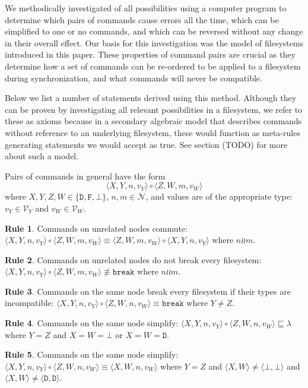 \documentclass[12pt]{article}
\newcommand{\setvx}[1]{\mathcal{V}_{#1}} %
\newcommand{\setn}{\mathcal{N}} %
\newcommand{\empt}{\bot}
\newcommand{\cbrk}{\mathtt{break}} %
\newcommand{\ccharb}{\empt}
\newcommand{\ccharf}{\mathtt{F}}
\newcommand{\cchard}{\mathtt{D}}
\newcommand{\valvy}{v_Y} %
\newcommand{\valvw}{v_W}
\newcommand{\typeset}{\{\cchard,\ccharf,\ccharb\}} %
\newcommand{\caa}[2]{\langle{#1,#2}\rangle}
\newcommand{\caaaa}[4]{\langle{#1,#2,#3,#4}\rangle}
\newcommand{\cbb}{\caa{\ccharb}{\ccharb}}
\newcommand{\cdd}{\caa{\cchard}{\cchard}}
\newcommand{\cxynv}{\caaaa{X}{Y}{n}{\valvy}}
\newcommand{\cxw}{\caa{X}{W}}
\newcommand{\cxwnv}{\caaaa{X}{W}{n}{\valvw}}
\newcommand{\czwnv}{\caaaa{Z}{W}{n}{\valvw}}
\newcommand{\czwmv}{\caaaa{Z}{W}{m}{\valvw}}
\newcommand{\cc}{\circ} %
\newcommand{\eqext}{\sqsubseteq} %
\newcommand{\nequiv}{\not\equiv}
\newcommand{\indep}{\mathrel{\wr\wr}} %
\newcommand{\unrel}{\indep} %
\newcommand{\emptyseq}{\lambda} %
\theoremstyle{definition}
\newtheorem{myax}{Rule}
\begin{document}
We methodically investigated of all possibilities using a computer program
to determine
which pairs of commands cause errors all the time,
which can be simplified to one or no commands, and which can be reversed
without any change in their overall effect.
Our basis for this investigation was the model of filesystems introduced in this paper.
These properties of command pairs are crucial as they determine
how a set of commands can be re-ordered to be applied to a filesystem
during synchronization, and what commands will never be compatible.

Below we list a number of statements derived using this method.
Although they can be proven by investigating all relevant possibilities
in a filesystem, we refer to these as axioms because in a secondary algebraic model
that describes commands without reference to an underlying filesystem,
these would function as meta-rules generating statements we would accept as true.
See section (TODO) for more about such a model.

\medskip

Pairs of commands in general have the form
\[ \cxynv\cc  \czwmv \]
where $X,Y,Z,W\in\typeset$, $n,m\in\setn$, 
and values are of the appropriate type: 
$\valvy\in\setvx{Y}$ and $\valvw\in\setvx{W}$.

\begin{myax}\label{ax_separate_commute}
Commands on unrelated nodes commute:
$\cxynv\cc\czwmv \equiv \czwmv\cc\cxynv$ where $n\unrel m$.
\end{myax}

\begin{myax}\label{ax_separate_nobreaks}
Commands on unrelated nodes do not break every filesystem:
$\cxynv\cc\czwmv \nequiv \cbrk$ where $n\unrel m$.
\end{myax}

\begin{myax}\label{ax_same_breaks}
Commands on the same node break every filesystem if their types are incompatible:
$\cxynv\cc\czwnv \equiv \cbrk$ where $Y\ne Z$.
\end{myax}

\begin{myax}\label{ax_same_emptyseq}
Commands on the same node simplify:
$\cxynv\cc\czwnv \eqext \emptyseq$ where $Y=Z$ and $X=W=\ccharb$ 
or $X=W=\cchard$.
\end{myax}

\begin{myax}\label{ax_same_singlec}
Commands on the same node simplify:
$\cxynv\cc \czwnv \equiv \cxwnv$ where $Y=Z$ and $\cxw\neq\cbb$ and $\cxw\neq\cdd$.
\end{myax}
\end{document}

